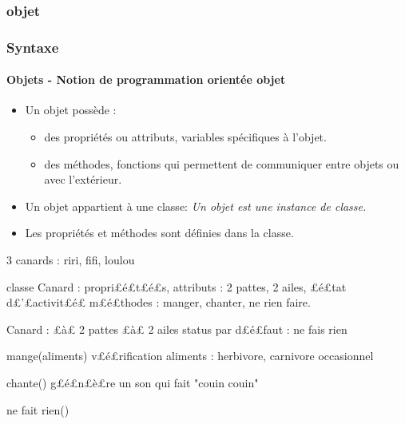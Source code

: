 \subsubsection{objet}
\begin{frame}[fragile]
\frametitle{Syntaxe}
\framesubtitle{Objets - Notion de programmation orientée objet}
\begin{itemize}
\item Un objet possède : 
 \begin{itemize}
  \item des propriétés ou attributs, variables spécifiques à l'objet. 
  \item des méthodes, fonctions qui permettent de communiquer entre objets ou avec l'extérieur. 
 \end{itemize}
\item Un objet appartient à une classe: {\em Un objet est une instance de classe. }
\item Les propriétés et méthodes sont définies dans la classe. 
\end{itemize}

\begin{pythonConsole}
3 canards : riri, fifi, loulou

classe Canard : 
propri£é£t£é£s, attributs : 2 pattes, 2 ailes, £é£tat d£'£activit£é£
m£é£thodes : manger, chanter, ne rien faire.  

Canard : 
 £à£ 2 pattes
 £à£ 2 ailes
 status par d£é£faut : ne fais rien
 
 mange(aliments)
  v£é£rification aliments : herbivore, carnivore occasionnel 
 
 chante()
  g£é£n£è£re un son qui fait "couin couin"  

 ne fait rien()
  
\end{pythonConsole}
\end{frame}
